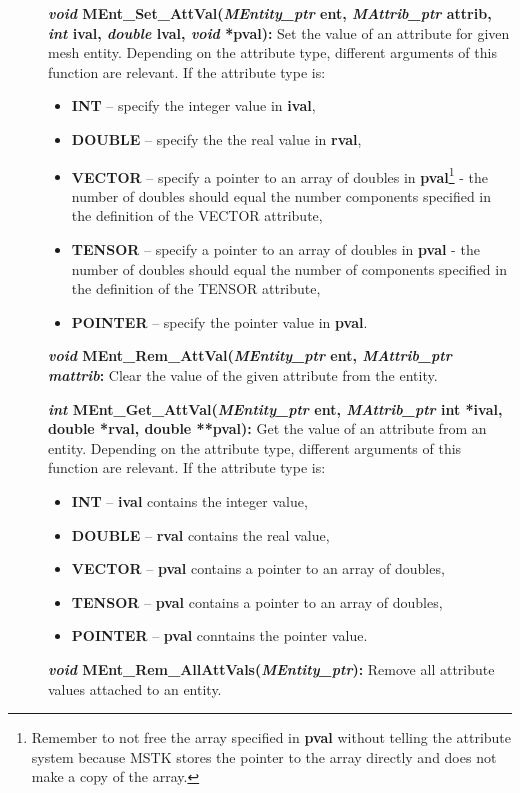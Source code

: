 \documentclass[12pt]{article}
\begin{document}
\begin{description}
\item[]{\bf {\em void} MEnt\_Set\_AttVal({\em MEntity\_ptr} ent, {\em
      MAttrib\_ptr} attrib, {\em int} ival, {\em double} lval, {\em
      void} *pval):} Set the value of an attribute for given mesh
  entity. Depending on the attribute type, different arguments of this
  function are relevant. If the attribute type is:

\begin{itemize}
  \item {\bf INT} -- specify the integer value in {\bf ival},
  \item {\bf DOUBLE} -- specify the the real value in {\bf rval},
  \item {\bf VECTOR} -- specify a pointer to an array of
    doubles in {\bf pval}\footnote{Remember to not free the array specified in {\bf pval} without telling the attribute system because MSTK stores the pointer to the array directly and does not make a copy of the array.} - the number of doubles should equal the number components specified in the definition of the VECTOR attribute,
  \item {\bf TENSOR} -- specify a pointer
    to an array of doubles in {\bf pval} - the number of doubles should equal the number of components specified in the definition of the TENSOR attribute,
  \item {\bf POINTER} -- specify the pointer value in {\bf pval}.
  \end{itemize}


    
\item[]{\bf {\em void} MEnt\_Rem\_AttVal({\em MEntity\_ptr}
    ent, {\em MAttrib\_ptr mattrib}:} Clear the value of the given
  attribute from the entity.
    
\item[]{\bf {\em int} MEnt\_Get\_AttVal({\em MEntity\_ptr} ent, {\em
      MAttrib\_ptr} int *ival, double *rval, double **pval):} Get the
  value of an attribute from an entity.  Depending on the attribute
  type, different arguments of this function are relevant. If the
  attribute type is:

  \begin{itemize}
  \item {\bf INT} -- {\bf ival} contains the integer value,
  \item {\bf DOUBLE} -- {\bf rval} contains the real value,
  \item {\bf VECTOR} -- {\bf pval} contains a pointer to an array of doubles,
  \item {\bf TENSOR} -- {\bf pval} contains a pointer
    to an array of doubles,
  \item {\bf POINTER} -- {\bf pval} conntains the pointer value.
  \end{itemize}

\item[]{\bf {\em void} MEnt\_Rem\_AllAttVals({\em MEntity\_ptr}):}
  Remove all attribute values attached to an entity.

\end{description}
\end{document}
